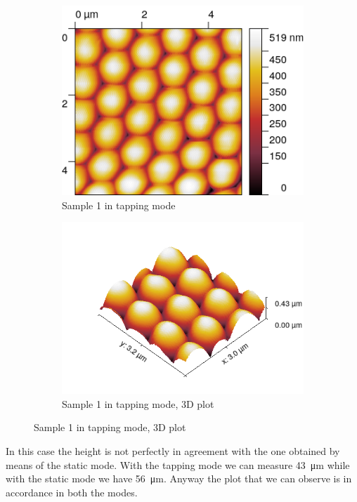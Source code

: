 \documentclass[11pt,a4paper]{article}
\begin{document}
\begin{figure}[H]
\centering
\begin{subfigure}[b]{0.45\textwidth}
\includegraphics[width=\textwidth]{tm_sample1}
\caption{Sample 1 in tapping mode}
\label{fig:}
\end{subfigure}
\begin{subfigure}[b]{0.45\textwidth}
\includegraphics[width=\textwidth]{tm_sample1_3D}
\caption{Sample 1 in tapping mode, 3D plot}
\label{fig:tapping_sample1}
\end{subfigure}
\end{figure}

In this case the height is not perfectly in agreement with the one obtained by means of the static mode. With the tapping mode we can measure \SI{43}{\micro\m} while with the static mode we have \SI{56}{\micro\m}. Anyway the plot that we can observe is in accordance in both the modes.
\end{document}
